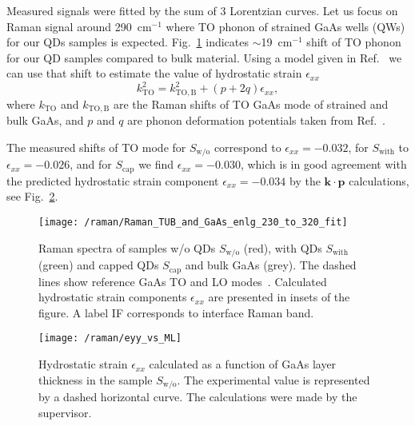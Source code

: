 Measured signals were fitted by the sum of 3 Lorentzian curves.
Let us focus on Raman signal around 290~cm$^{-1}$ where TO phonon of strained GaAs wells (QWs) for our QDs samples is expected. Fig.~\ref{fig:raman} indicates $\sim$19~cm$^{-1}$ shift of TO phonon for our QD samples compared to bulk material. Using a model given in Ref.~\cite{Montazeri_Nano2010} we can use that shift to estimate the value of hydrostatic strain $\epsilon_{xx}$ 
\begin{equation}
k_\mathrm{TO}^2 = k_\mathrm{TO,B}^2 + (p+2q)\epsilon_{xx},
\end{equation}
where $k_\mathrm{TO}$ and $k_\mathrm{TO,B}$ are the Raman shifts of TO GaAs mode of strained and bulk GaAs, and $p$ and $q$ are phonon deformation potentials taken from Ref.~\cite{Cerdeira_PRB1972}.

The measured shifts of TO mode for $S_\mathrm{w/o}$ correspond to $\epsilon_{xx}=-0.032$, for $S_\mathrm{with}$ to $\epsilon_{xx}=-0.026$,  and for $S_\mathrm{cap}$ we find $\epsilon_{xx}=-0.030$, which is in good agreement with the predicted hydrostatic strain component $\epsilon_{xx}=-0.034$ by the $\mathbf{k \cdot p}$ calculations, see Fig.~\ref{fig:raman_theory_wo}. %
\begin{figure}
	\centering
	\texttt{[image: /raman/Raman\_TUB\_and\_GaAs\_enlg\_230\_to\_320\_fit]}
	\caption{Raman spectra of samples w/o QDs $S_\mathrm{w/o}$ (red), with QDs $S_\mathrm{with}$ (green) and capped QDs $S_\mathrm{cap}$ and bulk GaAs (grey). The dashed lines show reference GaAs TO and LO modes~\citep{Esther_Nanotech2013}. Calculated hydrostatic strain components $\epsilon_{xx}$ are presented in insets of the figure. A label IF corresponds to interface Raman band.}
	\label{fig:raman}
\end{figure}

\begin{figure}
	\centering
	\texttt{[image: /raman/eyy\_vs\_ML]}
	\caption{Hydrostatic strain $\epsilon_{xx}$ calculated as a function of GaAs layer thickness in the sample $S_\mathrm{w/o}$. The experimental value is represented by a dashed horizontal curve. The calculations were made by the supervisor.}
	\label{fig:raman_theory_wo}
\end{figure}

{}


